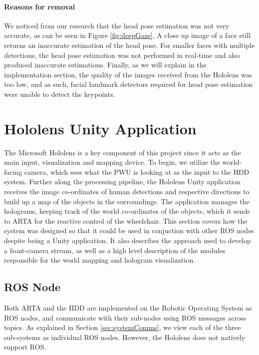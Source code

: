 \paragraph{Reasons for removal} We noticed from our research that the head pose estimation was not very accurate, as can be seen in Figure \ref{fig:deepGaze}. A close up image of a face still returns an inaccurate estimation of the head pose. For smaller faces with multiple detections, the head pose estimation was not performed in real-time and also produced inaccurate estimations. Finally, as we will explain in the implementation section, the quality of the images received from the Hololens was too low, and as such, facial landmark detectors required for head pose estimation were unable to detect the keypoints.

\section{Hololens Unity Application}
The Microsoft Hololens is a key component of this project since it acts as the main input, visualization and mapping device. To begin, we utilize the world-facing camera, which sees what the PWU is looking at as the input to the HDD system. Further along the processing pipeline, the Hololens Unity application receives the image co-ordinates of human detections and respective directions to build up a map of the objects in the surroundings. The application manages the holograms, keeping track of the world co-ordinates of the objects, which it sends to ARTA for the reactive control of the wheelchair.
This section covers how the system was designed so that it could be used in conjuction with other ROS nodes despite being a Unity application. It also describes the approach used to develop a front-camera stream, as well as a high level description of the modules responsible for the world mapping and hologram visualization.

\subsection{ROS Node}
Both ARTA and the HDD are implemented on the Robotic Operating System as ROS nodes, and communicate with their sub-nodes using ROS messages across topics. As explained in Section \ref{sec:systemComms}, we view each of the three sub-systems as individual ROS nodes. However, the Hololens does not natively support ROS.

